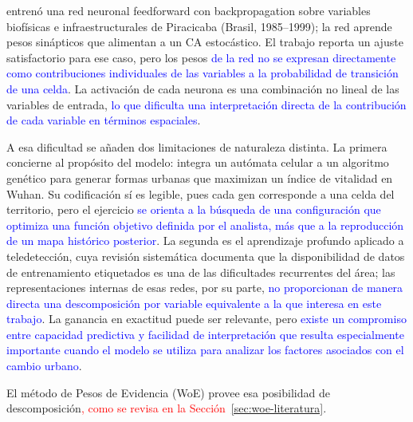 \textcite{almeida2008stochastic} entrenó una red neuronal feedforward con
backpropagation sobre variables biofísicas e infraestructurales de Piracicaba
(Brasil, 1985--1999); la red aprende pesos sinápticos que alimentan a un CA
estocástico. El trabajo reporta un ajuste satisfactorio para ese caso, pero
los pesos \textcolor{blue}{de la red no se expresan directamente como
contribuciones individuales de las variables a la probabilidad de transición
de una celda}. La activación de cada neurona es una combinación no lineal de
las variables de entrada, \textcolor{blue}{lo que dificulta una interpretación
directa de la contribución de cada variable en términos espaciales}.

A esa dificultad se añaden dos limitaciones de naturaleza distinta. La primera
concierne al propósito del modelo: \textcite{Wang2021} integra un autómata
celular a un algoritmo genético para generar formas urbanas que maximizan un
índice de vitalidad en Wuhan. Su codificación sí es legible, pues cada gen
corresponde a una celda del territorio, pero el ejercicio
\textcolor{blue}{se orienta a la búsqueda de una configuración que optimiza una
función objetivo definida por el analista, más que a la reproducción de un
mapa histórico posterior}. La segunda es el aprendizaje profundo aplicado a
teledetección, cuya revisión sistemática \parencite{Ma2019} documenta que la
disponibilidad de datos de entrenamiento etiquetados es una de las dificultades
recurrentes del área; las representaciones internas de esas redes, por su
parte, \textcolor{blue}{no proporcionan de manera directa una descomposición
por variable equivalente a la que interesa en este trabajo}. La ganancia en
exactitud puede ser relevante, pero \textcolor{blue}{existe un compromiso entre
capacidad predictiva y facilidad de interpretación que resulta especialmente
importante cuando el modelo se utiliza para analizar los factores asociados
con el cambio urbano}.

El método de Pesos de Evidencia (WoE) provee esa posibilidad de
descomposición\textcolor{red}{, como se revisa en la
Sección~\ref{sec:woe-literatura}}.




